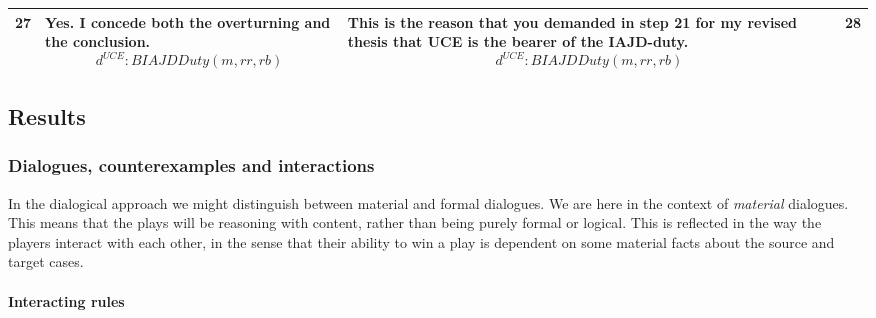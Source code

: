 {\begin{xltabular}{\textwidth}{| l | X  | X | l |}
27 & Yes. I concede both the overturning and the conclusion. \[d^{UCE}: BIAJDDuty(m,rr,rb)\] & This is the reason that you demanded in step 21 for my revised thesis that UCE is the bearer of the IAJD-duty. \[d^{UCE}: BIAJDDuty(m,rr,rb)\] & 28 \\ \hline
\end{xltabular}}

	
		\subsection{Results}
			
			\subsubsection{Dialogues, counterexamples and interactions}
			
				In the dialogical approach we might distinguish between material and formal dialogues. We are here in the context of \textit{material} dialogues. This means that the plays will be reasoning with content, rather than being purely formal or logical. This is reflected in the way the players interact with each other, in the sense that their ability to win a play is dependent on some material facts about the source and target cases. 
				
				\paragraph{Interacting rules}
				
